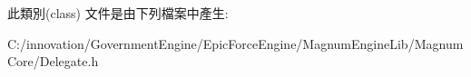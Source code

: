 此類別(class) 文件是由下列檔案中產生\+:\begin{DoxyCompactItemize}
\item 
C\+:/innovation/\+Government\+Engine/\+Epic\+Force\+Engine/\+Magnum\+Engine\+Lib/\+Magnum\+Core/Delegate.\+h\end{DoxyCompactItemize}
